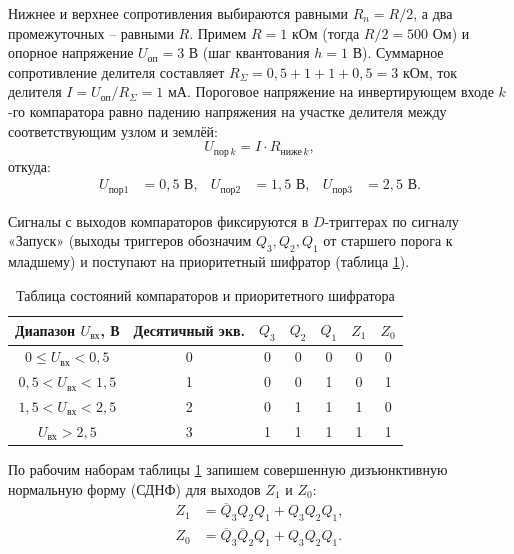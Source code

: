 \documentclass[14pt, a4paper]{extarticle}
\begin{document}
	Нижнее и верхнее сопротивления выбираются равными $R_n = R/2$, а два промежуточных -- равными $R$. Примем $R = 1\text{ кОм}$ (тогда $R/2 = 500\text{ Ом}$) и опорное напряжение $U_{\text{оп}} = 3\text{ В}$ (шаг квантования $h = 1\text{ В}$). Суммарное сопротивление делителя составляет $R_{\Sigma} = 0{,}5 + 1 + 1 + 0{,}5 = 3\text{ кОм}$, ток делителя $I = U_{\text{оп}}/R_{\Sigma} = 1\text{ мА}$. Пороговое напряжение на инвертирующем входе $k$-го компаратора равно падению напряжения на участке делителя между соответствующим узлом и землёй:
	\begin{equation*}
		U_{\text{пор}\,k} = I \cdot R_{\text{ниже}\,k},
	\end{equation*}
	откуда:
	\begin{align*}
		U_{\text{пор1}} &= 0{,}5\text{ В}, & U_{\text{пор2}} &= 1{,}5\text{ В}, & U_{\text{пор3}} &= 2{,}5\text{ В}.
	\end{align*}
	
	Сигналы с выходов компараторов фиксируются в $D$-триггерах по сигналу «Запуск» (выходы триггеров обозначим $Q_3, Q_2, Q_1$ от старшего порога к младшему) и поступают на приоритетный шифратор (таблица \ref{tab:flash_enc}).
	
	\begin{table}[H]
		\centering
		\begin{tabular}{|c|c|c|c|c|c|c|}
			\hline
			Диапазон $U_{\text{вх}}$, В & Десятичный экв. & $Q_3$ & $Q_2$ & $Q_1$ & $Z_1$ & $Z_0$ \\ \hline
			$0 \le U_{\text{вх}} < 0{,}5$ & 0 & 0 & 0 & 0 & 0 & 0 \\ \hline
			$0{,}5 < U_{\text{вх}} < 1{,}5$ & 1 & 0 & 0 & 1 & 0 & 1 \\ \hline
			$1{,}5 < U_{\text{вх}} < 2{,}5$ & 2 & 0 & 1 & 1 & 1 & 0 \\ \hline
			$U_{\text{вх}} > 2{,}5$ & 3 & 1 & 1 & 1 & 1 & 1 \\ \hline
		\end{tabular}
		\caption{Таблица состояний компараторов и приоритетного шифратора}
		\label{tab:flash_enc}
	\end{table}
	
	
	По рабочим наборам таблицы \ref{tab:flash_enc} запишем совершенную дизъюнктивную нормальную форму (СДНФ) для выходов $Z_1$ и $Z_0$:
	\begin{align*}
		Z_1 &= \overline{Q}_3 Q_2 Q_1 + Q_3 Q_2 Q_1, \\
		Z_0 &= \overline{Q}_3 \overline{Q}_2 Q_1 + Q_3 Q_2 Q_1.
	\end{align*}
	
\end{document}
